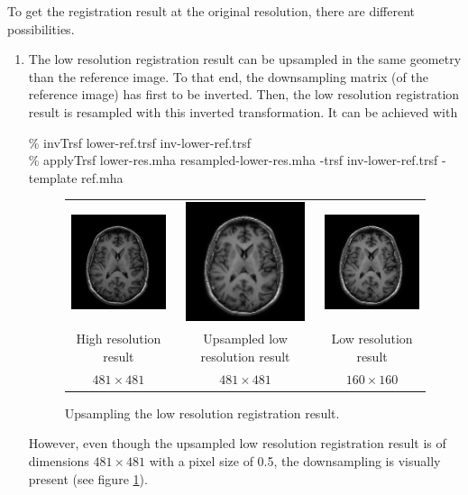 To get the registration result at the original resolution, there are different possibilities.
\begin{enumerate}

\item The low resolution registration result can be upsampled in the same geometry than the reference image. To that end, the downsampling matrix (of the reference image) has first to be inverted. Then, the  low resolution registration result is resampled with this inverted transformation. It can be achieved with
\begin{code}{1}
\% invTrsf lower-ref.trsf inv-lower-ref.trsf \\
\% applyTrsf lower-res.mha resampled-lower-res.mha -trsf inv-lower-ref.trsf -template ref.mha
\end{code}
\begin{figure}[ht]
\begin{center}
\begin{tabular}{ccc}
\includegraphics[width=35mm]{use-examples/applyTrsf-blockmatching/res.png} &
\includegraphics[width=35mm]{use-examples/applyTrsf-blockmatching/resampled-lower-res.png} &
\includegraphics[width=35mm]{use-examples/applyTrsf-blockmatching/lower-res.png} \\
High resolution result &
Upsampled low resolution result &
Low resolution result \\
$481 \times 481$ &
$481 \times 481$ &
$160 \times 160$
\end{tabular}
\end{center}
\caption{\label{fig:exe:applyTrsf:blockmatching:3} Upsampling the low resolution registration result.}
\end{figure}
However, even though the upsampled low resolution registration result is of dimensions $481 \times 481$ with a pixel size of 0.5, the downsampling is visually present (see figure \ref{fig:exe:applyTrsf:blockmatching:3}).


\end{enumerate}
